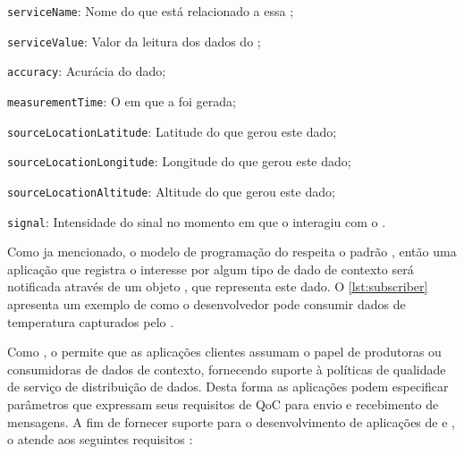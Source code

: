 \begin{alineas}
	\item \texttt{serviceName}: Nome do \smartobj que está relacionado a essa \msg;

	\item \texttt{serviceValue}: Valor da leitura dos dados do \smartobj;

	\item \texttt{accuracy}: Acurácia do dado;

	\item \texttt{measurementTime}: O \timestamp em que a \msg foi gerada;

	\item \texttt{sourceLocationLatitude}: Latitude do \mhub que gerou este dado;

	\item \texttt{sourceLocationLongitude}: Longitude do \mhub que gerou este dado;

	\item \texttt{sourceLocationAltitude}: Altitude do \mhub que gerou este dado;

	\item \texttt{signal}: Intensidade do sinal no momento em que o \smartobj interagiu com o \stwopa.
\end{alineas}

Como ja mencionado, o modelo de programação do \cddl respeita o padrão \pubsub, então uma aplicação que registra o interesse por algum tipo de dado de contexto será notificada através de um objeto \msg, que representa este dado.
O \autoref{lst:subscriber} apresenta um exemplo de como o desenvolvedor pode consumir dados de temperatura capturados pelo \middleware.



Como \middleware, o \cddl permite que as aplicações clientes assumam o papel de produtoras ou consumidoras de dados de contexto, fornecendo suporte à políticas de qualidade de serviço de distribuição de dados. Desta forma as aplicações podem especificar parâmetros que expressam seus requisitos de QoC para envio e recebimento de mensagens. A fim de fornecer suporte para o desenvolvimento de aplicações de \iot e \iomt, o \cddl atende aos seguintes requisitos \cite{muniz:2017}:

